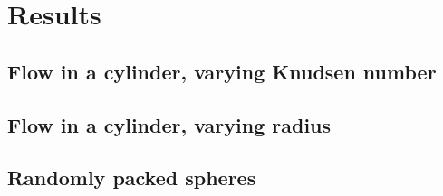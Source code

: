\section{Results}
\subsection{Flow in a cylinder, varying Knudsen number}
\subsection{Flow in a cylinder, varying radius}
\subsection{Randomly packed spheres}